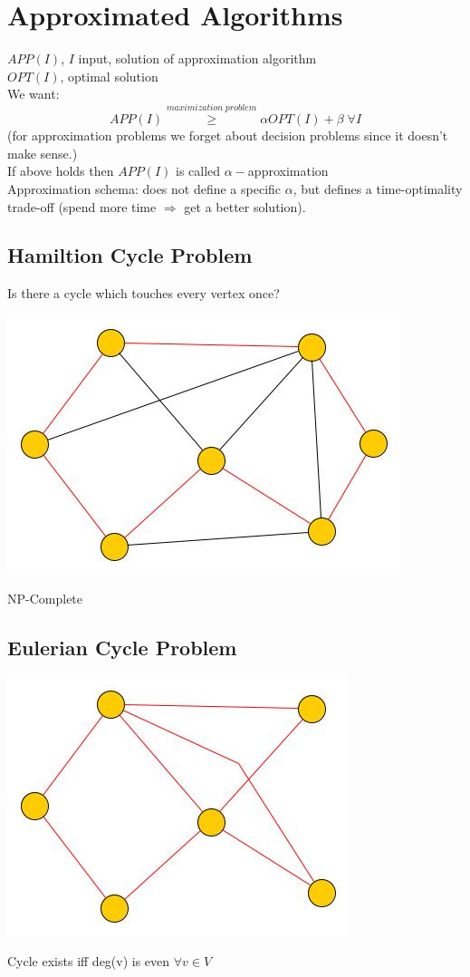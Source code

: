 \section{Approximated Algorithms}
$APP(I)$, $I$ input, solution of approximation algorithm \\
$OPT(I)$, optimal solution \\
We want: $$APP(I) \stackrel{maximization \; problem}{\geq} \alpha OPT(I) + \beta \; \forall I$$
(for approximation problems we forget about decision problems since it doesn't make sense.) \\
If above holds then $APP(I)$ is called $\alpha-$approximation \\
Approximation schema: does not define a specific $\alpha$, but defines a time-optimality trade-off (spend more time $\Rightarrow$ get a better solution).

\subsection{Hamiltion Cycle Problem}
Is there a cycle which touches every vertex once?
\begin{center}
	\includegraphics[scale=0.5]{img/graph27}
\end{center}
NP-Complete
\subsection{Eulerian Cycle Problem}
\begin{center}
	\includegraphics[scale=0.5]{img/graph28}
\end{center}
Cycle exists iff deg(v) is even $\forall v \in V$

